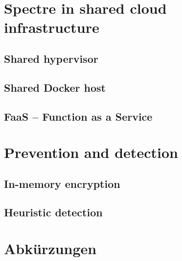 \documentclass[conference,compsoc,final,a4paper]{IEEEtran}
\begin{document}
\section{Spectre in shared cloud infrastructure}

\subsection{Shared hypervisor}

\subsection{Shared Docker host}

\subsection{FaaS -- Function as a Service}

\section{Prevention and detection}
\subsection{In-memory encryption}
\subsection{Heuristic detection}

\section*{Abkürzungen}

\begin{acronym}[IEEE]
\end{acronym}

\printbibliography
\end{document}
